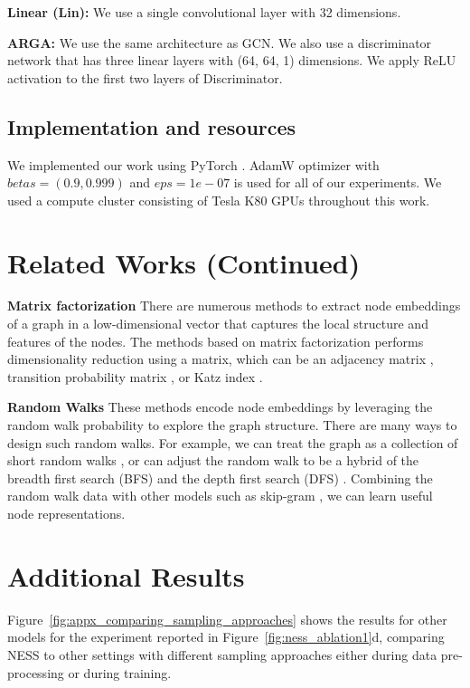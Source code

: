 \documentclass{article}
\begin{document}
\textbf{Linear (Lin):} We use a single convolutional layer with 32 dimensions.

\textbf{ARGA:} We use the same architecture as GCN. We also use a discriminator network that has three linear layers with (64, 64, 1) dimensions. We apply ReLU activation to the first two layers of Discriminator.


\subsection{Implementation and resources}\label{implementation_resources}
We implemented our work using PyTorch \citep{NEURIPS2019_9015}. AdamW optimizer \citep{loshchilov2017decoupled} with $betas=(0.9, 0.999)$ and $eps=1e-07$ is used for all of our experiments. We used a compute cluster consisting of Tesla K80 GPUs throughout this work. 


\section{Related Works (Continued)}

\textbf{Matrix factorization} There are numerous methods to extract node embeddings of a graph in a low-dimensional vector that captures the local structure and features of the nodes. The methods based on matrix factorization performs dimensionality reduction using a matrix, which can be an adjacency matrix \citep{ahmed2013distributed}, transition probability matrix \citep{cao2015grarep}, or Katz index \citep{katz1953new}. 

\textbf{Random Walks} These methods encode node embeddings by leveraging the random walk probability to explore the graph structure.  There are many ways to design such random walks. For example, we can treat the graph as a collection of short random walks \citep{perozzi2014deepwalk}, or can adjust the random walk to be a hybrid of the breadth first search (BFS) and the depth first search (DFS) \citep{grover2016node2vec}. Combining the random walk data with other models such as skip-gram \citep{mikolov2013efficient}, we can learn useful node representations.



\section{Additional Results}

Figure~\ref{fig:appx_comparing_sampling_approaches} shows the results for other models for the experiment reported in Figure~\ref{fig:ness_ablation1}d, comparing NESS to other settings with different sampling approaches either during data pre-processing or during training.
\end{document}
